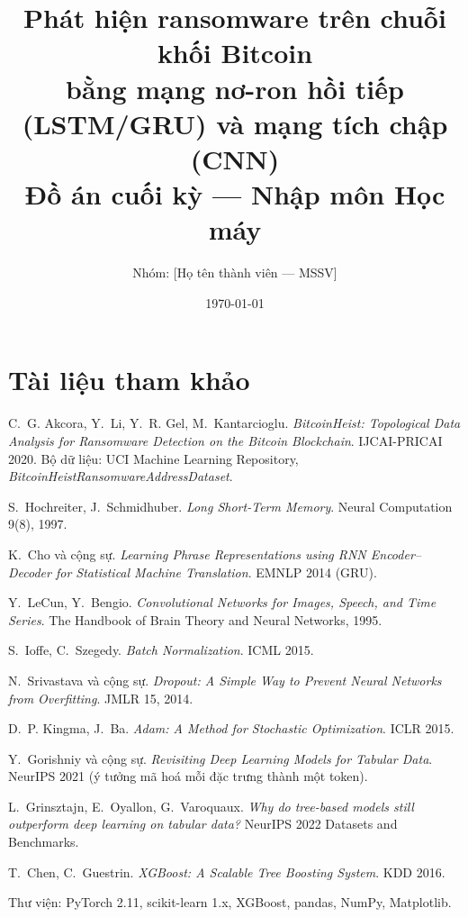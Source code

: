 \documentclass[11pt,a4paper]{article}
\title{\textbf{Phát hiện ransomware trên chuỗi khối Bitcoin\\bằng mạng nơ-ron hồi tiếp (LSTM/GRU) và mạng tích chập (CNN)}\\[4pt]
\large Đồ án cuối kỳ — Nhập môn Học máy}
\author{Nhóm: [Họ tên thành viên — MSSV]}
\date{\today}
\begin{document}
\maketitle

\begin{abstract}

\end{abstract}

\tableofcontents
\newpage










\section*{Tài liệu tham khảo}
\begin{enumerate}[label={[\arabic*]}]
\item C.~G. Akcora, Y.~Li, Y.~R. Gel, M.~Kantarcioglu. \emph{BitcoinHeist: Topological Data Analysis for Ransomware Detection on the Bitcoin Blockchain}. IJCAI-PRICAI 2020. Bộ dữ liệu: UCI Machine Learning Repository, \emph{BitcoinHeistRansomwareAddressDataset}.
\item S.~Hochreiter, J.~Schmidhuber. \emph{Long Short-Term Memory}. Neural Computation 9(8), 1997.
\item K.~Cho và cộng sự. \emph{Learning Phrase Representations using RNN Encoder–Decoder for Statistical Machine Translation}. EMNLP 2014 (GRU).
\item Y.~LeCun, Y.~Bengio. \emph{Convolutional Networks for Images, Speech, and Time Series}. The Handbook of Brain Theory and Neural Networks, 1995.
\item S.~Ioffe, C.~Szegedy. \emph{Batch Normalization}. ICML 2015.
\item N.~Srivastava và cộng sự. \emph{Dropout: A Simple Way to Prevent Neural Networks from Overfitting}. JMLR 15, 2014.
\item D.~P. Kingma, J.~Ba. \emph{Adam: A Method for Stochastic Optimization}. ICLR 2015.
\item Y.~Gorishniy và cộng sự. \emph{Revisiting Deep Learning Models for Tabular Data}. NeurIPS 2021 (ý tưởng mã hoá mỗi đặc trưng thành một token).
\item L.~Grinsztajn, E.~Oyallon, G.~Varoquaux. \emph{Why do tree-based models still outperform deep learning on tabular data?} NeurIPS 2022 Datasets and Benchmarks.
\item T.~Chen, C.~Guestrin. \emph{XGBoost: A Scalable Tree Boosting System}. KDD 2016.
\item Thư viện: PyTorch 2.11, scikit-learn 1.x, XGBoost, pandas, NumPy, Matplotlib.
\end{enumerate}

\appendix

\end{document}
